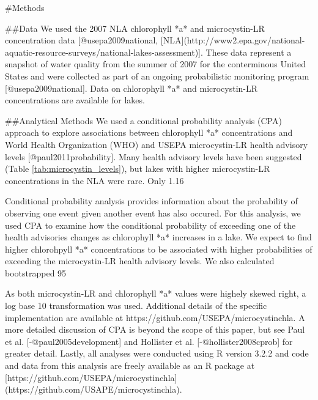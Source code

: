 #Methods

##Data
We used the 2007 NLA chlorophyll *a* and microcystin-LR concentration data [@usepa2009national, [NLA](http://www2.epa.gov/national-aquatic-resource-surveys/national-lakes-assessment)]. These data represent a snapshot of water quality from the summer of 2007 for the conterminous United States and were collected as part of an ongoing probabilistic monitoring program [@usepa2009national]. Data on chlorophyll *a* and microcystin-LR concentrations are available for  lakes.  

##Analytical Methods
We used a conditional probability analysis (CPA) approach to explore associations between chlorophyll *a* concentrations and World Health Organization (WHO) and USEPA microcystin-LR health advisory levels [@paul2011probability].  Many health advisory levels have been suggested (Table \ref{tab:microcystin_levels}), but lakes with higher microcystin-LR concentrations in the NLA were rare. Only 1.16%

Conditional probability analysis provides information about the probability of observing one event given another event has also occured.  For this analysis, we used CPA to examine how the conditional probability of exceeding one of the health advisories changes as chlorophyll *a* increases in a lake.  We expect to find higher chlorohpyll *a* concentrations to be associated with higher probabilities of exceeding the microcystin-LR health advisory levels.  We also calculated bootstrapped 95%

As both microcystin-LR and chlorophyll *a* values were highely skewed right, a log base 10 transformation was used.  Additional details of the specific implementation are available at https://github.com/USEPA/microcystinchla.  A more detailed discussion of CPA is beyond the scope of this paper, but see Paul et al. [-@paul2005development] and Hollister et al. [-@hollister2008cprob] for greater detail.  Lastly, all analyses were conducted using R version 3.2.2 and code and data from this analysis are freely available as an R package at [https://github.com/USEPA/microcystinchla](https://github.com/USAPE/microcystinchla).  


